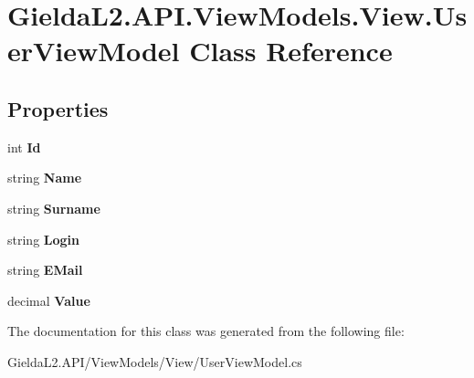 \hypertarget{class_gielda_l2_1_1_a_p_i_1_1_view_models_1_1_view_1_1_user_view_model}{}\section{Gielda\+L2.\+A\+P\+I.\+View\+Models.\+View.\+User\+View\+Model Class Reference}
\label{class_gielda_l2_1_1_a_p_i_1_1_view_models_1_1_view_1_1_user_view_model}
\subsection*{Properties}
\begin{DoxyCompactItemize}
\item 
\mbox{\label{class_gielda_l2_1_1_a_p_i_1_1_view_models_1_1_view_1_1_user_view_model_a31ab3916648df63159a65bbfd63436f3}} 
int {\bfseries Id}
\item 
\mbox{\label{class_gielda_l2_1_1_a_p_i_1_1_view_models_1_1_view_1_1_user_view_model_a358c1d7c59c3eefe8223559f6e309d7e}} 
string {\bfseries Name}
\item 
\mbox{\label{class_gielda_l2_1_1_a_p_i_1_1_view_models_1_1_view_1_1_user_view_model_aa4707e21d78bd91e1e4c8383bcf9e9f4}} 
string {\bfseries Surname}
\item 
\mbox{\label{class_gielda_l2_1_1_a_p_i_1_1_view_models_1_1_view_1_1_user_view_model_a3053154cb490c1b7d4e74c533242f5eb}} 
string {\bfseries Login}
\item 
\mbox{\label{class_gielda_l2_1_1_a_p_i_1_1_view_models_1_1_view_1_1_user_view_model_a01d9db3d4355dfe0b1eecb8664268f1c}} 
string {\bfseries E\+Mail}
\item 
\mbox{\label{class_gielda_l2_1_1_a_p_i_1_1_view_models_1_1_view_1_1_user_view_model_a0ef8f70d74d0cff1ab5c7f5e7c663c79}} 
decimal {\bfseries Value}
\end{DoxyCompactItemize}


The documentation for this class was generated from the following file\+:\begin{DoxyCompactItemize}
\item 
Gielda\+L2.\+A\+P\+I/\+View\+Models/\+View/User\+View\+Model.\+cs\end{DoxyCompactItemize}
